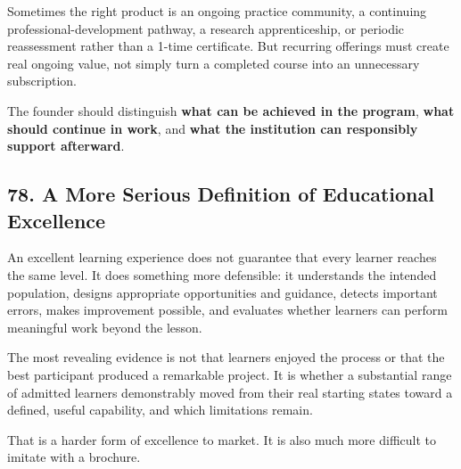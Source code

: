 Sometimes the right product is an ongoing practice community, a continuing professional-development pathway, a research apprenticeship, or periodic reassessment rather than a 1-time certificate. But recurring offerings must create real ongoing value, not simply turn a completed course into an unnecessary subscription.

The founder should distinguish \textbf{what can be achieved in the program}, \textbf{what should continue in work}, and \textbf{what the institution can responsibly support afterward}.

\subsection*{78. A More Serious Definition of Educational Excellence}

An excellent learning experience does not guarantee that every learner reaches the same level. It does something more defensible: it understands the intended population, designs appropriate opportunities and guidance, detects important errors, makes improvement possible, and evaluates whether learners can perform meaningful work beyond the lesson.

The most revealing evidence is not that learners enjoyed the process or that the best participant produced a remarkable project. It is whether a substantial range of admitted learners demonstrably moved from their real starting states toward a defined, useful capability, and which limitations remain.

That is a harder form of excellence to market. It is also much more difficult to imitate with a brochure.
